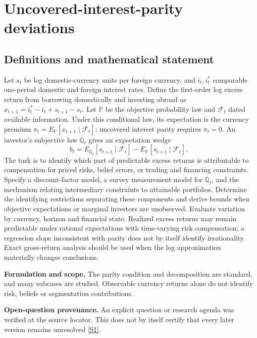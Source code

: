 \documentclass[11pt]{article}
\newcommand{\sref}[2]{\hyperlink{source:#1:#2}{[S#2]}}
\begin{document}
\section*{Uncovered-interest-parity deviations}\label{30007614}
\subsection{Definitions and mathematical statement}
Let \(s_t\) be log domestic-currency units per foreign currency, and \(i_t,i_t^*\) comparable one-period domestic and foreign interest rates. Define the first-order log excess return from borrowing domestically and investing abroad as \(x_{t+1}=i_t^*-i_t+s_{t+1}-s_t\). Let \(\mathbb P\) be the objective probability law and \(\mathcal F_t\) dated available information. Under this conditional law, its expectation is the currency premium \(\pi_t=E_{\mathbb P}[x_{t+1}\mid\mathcal F_t]\); uncovered interest parity requires \(\pi_t=0\). An investor's subjective law \(\mathbb Q_t\) gives an expectation wedge
\[b_t=E_{\mathbb Q_t}[s_{t+1}\mid\mathcal F_t]-E_{\mathbb P}[s_{t+1}\mid\mathcal F_t].\]
The task is to identify which part of predictable excess returns is attributable to compensation for priced risks, belief errors, or trading and financing constraints. Specify a discount-factor model, a survey measurement model for \(\mathbb Q_t\), and the mechanism relating intermediary constraints to attainable portfolios. Determine the identifying restrictions separating these components and derive bounds when objective expectations or marginal investors are unobserved. Evaluate variation by currency, horizon and financial state. Realized excess returns may remain predictable under rational expectations with time-varying risk compensation; a regression slope inconsistent with parity does not by itself identify irrationality. Exact gross-return analysis should be used when the log approximation materially changes conclusions.

\par\textbf{Formulation and scope.} The parity condition and decomposition are standard, and many subcases are studied. Observable currency returns alone do not identify risk, beliefs or segmentation contributions.

\par\textbf{Open-question provenance.} An explicit question or research agenda was verified at the source locator. This does not by itself certify that every later version remains unresolved \sref{30007614}{1}.
\end{document}
